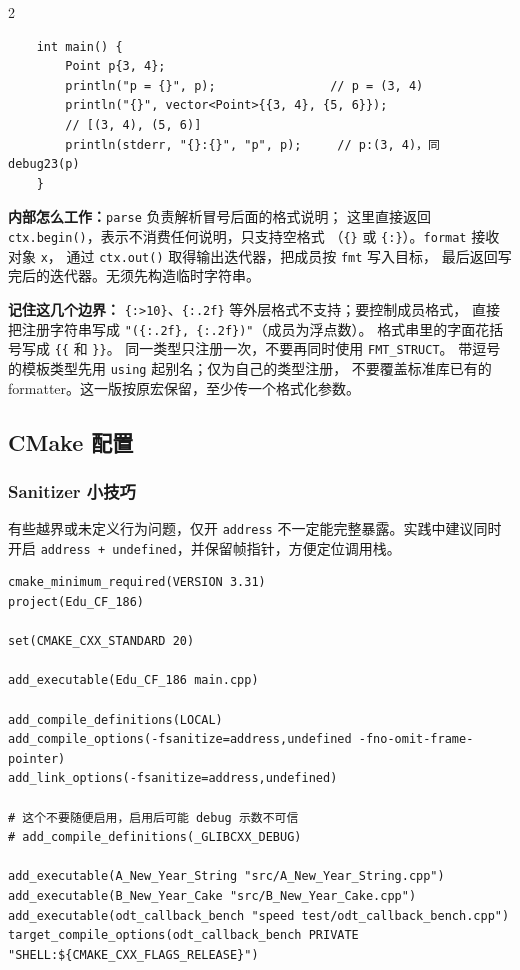 \begin{multicols*}{2}
\begin{verbatim}
	int main() {
	    Point p{3, 4};
	    println("p = {}", p);                // p = (3, 4)
	    println("{}", vector<Point>{{3, 4}, {5, 6}});
	    // [(3, 4), (5, 6)]
	    println(stderr, "{}:{}", "p", p);     // p:(3, 4)，同 debug23(p)
	}
	\end{verbatim}
	
	\textbf{内部怎么工作：}\texttt{parse} 负责解析冒号后面的格式说明；
	这里直接返回 \texttt{ctx.begin()}，表示不消费任何说明，只支持空格式
	（\texttt{\{\}} 或 \texttt{\{:\}}）。\texttt{format} 接收对象 \texttt{x}，
	通过 \texttt{ctx.out()} 取得输出迭代器，把成员按 \texttt{fmt} 写入目标，
	最后返回写完后的迭代器。无须先构造临时字符串。
	
	\textbf{记住这几个边界：}
	\texttt{\{:>10\}}、\texttt{\{:.2f\}} 等外层格式不支持；要控制成员格式，
	直接把注册字符串写成 \texttt{"(\{:.2f\}, \{:.2f\})"}（成员为浮点数）。
	格式串里的字面花括号写成 \texttt{\{\{} 和 \texttt{\}\}}。
	同一类型只注册一次，不要再同时使用 \texttt{FMT\_STRUCT}。
	带逗号的模板类型先用 \texttt{using} 起别名；仅为自己的类型注册，
	不要覆盖标准库已有的 formatter。这一版按原宏保留，至少传一个格式化参数。
	
	\subsection{CMake 配置}

	\subsubsection{Sanitizer 小技巧}

	有些越界或未定义行为问题，仅开 \texttt{address} 不一定能完整暴露。实践中建议同时开启 \texttt{address + undefined}，并保留帧指针，方便定位调用栈。

	\begin{verbatim}
cmake_minimum_required(VERSION 3.31)
project(Edu_CF_186)

set(CMAKE_CXX_STANDARD 20)

add_executable(Edu_CF_186 main.cpp)

add_compile_definitions(LOCAL)
add_compile_options(-fsanitize=address,undefined -fno-omit-frame-pointer)
add_link_options(-fsanitize=address,undefined)

# 这个不要随便启用，启用后可能 debug 示数不可信
# add_compile_definitions(_GLIBCXX_DEBUG)

add_executable(A_New_Year_String "src/A_New_Year_String.cpp")
add_executable(B_New_Year_Cake "src/B_New_Year_Cake.cpp")
add_executable(odt_callback_bench "speed test/odt_callback_bench.cpp")
target_compile_options(odt_callback_bench PRIVATE "SHELL:${CMAKE_CXX_FLAGS_RELEASE}")
	\end{verbatim}


\end{multicols*}

